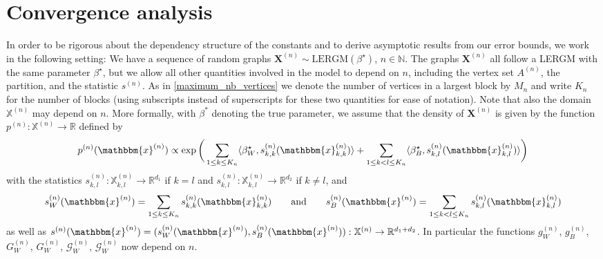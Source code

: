 \documentclass{article}
\begin{document}
\section{Convergence analysis} \label{section_convergence_analysis}
In order to be rigorous about the dependency structure of the constants and to derive asymptotic results from our error bounds, we work in the following setting: We have a sequence of random graphs $\mathbf{X}^{(n)} \sim \mathrm{LERGM}(\beta^{\star}) $, $n \in \mathbb{N}$. The graphs $\mathbf{X}^{(n)}$ all follow a LERGM with the same parameter $\beta^{\star}$,  but we allow all other quantities involved in the model to depend on $n$,  including the vertex set $A^{(n)}$,  the partition,  and the statistic $s^{(n)}$. As in \eqref{maximum_nb_vertices} we denote the number of vertices in a largest block by $M_n$ 
and write $K_n$  for the number of blocks (using subscripts instead of superscripts for these two quantities for ease of notation). Note that  also  the domain $\mathbb{X}^{(n)}$ may depend on $n$. More formally, with $\beta^*$ denoting the true parameter, we assume that the density of $\mathbf{X}^{(n)}$ is given by the function $p^{(n)}: \mathbb{X}^{(n)} \rightarrow \mathbb{R}$ defined by
\begin{align*}
    p^{(n)}(\mathbbm{x}^{(n)}) \propto  \exp \bigg(  \sum_{1\leq k \leq K_n} \langle \beta_W^{\star}, s_{k,k}^{(n)}(\mathbbm{x}_{k,k}^{(n)}) \rangle  + \sum_{1\leq k <l \leq K_n} \langle \beta_B^{\star}, s_{k,l}^{(n)}(\mathbbm{x}_{k,l}^{(n)}) \rangle \bigg)
\end{align*}
with the statistics $s_{k,l}^{(n)}:\mathbb{X}_{k,l}^{(n)} \rightarrow \mathbb{R}^{d_1}$ if $k=l$ and $s_{k,l}^{(n)}:\mathbb{X}_{k,l}^{(n)} \rightarrow \mathbb{R}^{d_2}$ if $k \neq l$,  and
\begin{align*}
    s_W^{(n)}(\mathbbm{x}^{(n)}) = \sum_{1\leq k \leq K_n} s_{k,k}^{(n)}(\mathbbm{x}_{k,k}^{(n)}) \qquad \text{and} \qquad s_B^{(n)}(\mathbbm{x}^{(n)}) = \sum_{1\leq k <l \leq K_n} s_{k,l}^{(n)}(\mathbbm{x}_{k,l}^{(n)})
\end{align*}
as well as $s^{(n)}(\mathbbm{x}^{(n)}) = (s_W^{(n)}(\mathbbm{x}^{(n)}),s_B^{(n)}(\mathbbm{x}^{(n)})): \mathbb{X}^{(n)} \rightarrow \mathbb{R}^{d_1+ d_2} $. In particular  the functions $g_W^{(n)}$, $g_B^{(n)}$, $G_W^{(n)}$, $G_W^{(n)}$, $\mathcal{G}_W^{(n)}$, $\mathcal{G}_W^{(n)}$ now depend on $n$. 
\end{document}
